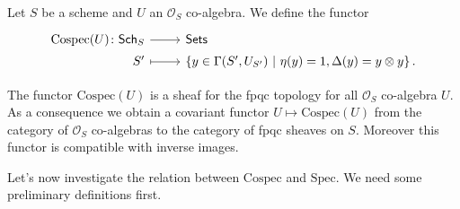\begin{defn}[]
	Let $S$ be a scheme and $U$ an $\mathcal{O}_{ S }$ co-algebra.
	We define the functor 
	\begin{equation*}
	\begin{tikzcd}[row sep = 0ex
		,/tikz/column 1/.append style={anchor=base east}
		,/tikz/column 2/.append style={anchor=base west}]
		\mathrm{Cospec}(U)\colon 
		\mathsf{Sch}_{ S }\arrow[r, "", rightarrow] &
		\mathsf{Sets} \\
		S' \arrow[r, "", mapsto] & 
		\left\{ y \in \Gamma(S', U_{S'}) \ \middle|\ 
		\eta(y) = 1, \Delta(y) = y \otimes y\right\}
	.\end{tikzcd}
	\end{equation*} 
\end{defn}


\begin{rem}
	The functor $\mathrm{Cospec}(U)$ is a sheaf for the fpqc topology
	for all $\mathcal{O}_{ S }$ co-algebra $U$.
	As a consequence we obtain a covariant functor $U \mapsto \mathrm{Cospec}(U)$
	from the category of $\mathcal{O}_{ S }$ co-algebras to the category
	of fpqc sheaves on $S$.
	Moreover this functor is compatible with inverse images.
\end{rem}


\noindent
Let's now investigate the relation between $\mathrm{Cospec}$ and $\mathrm{Spec}$.
We need some preliminary definitions first.


